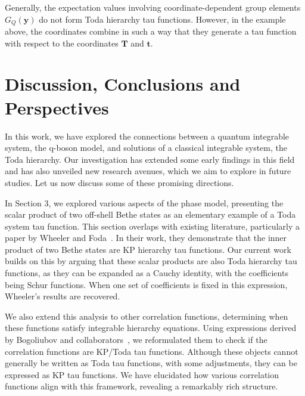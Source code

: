 \documentclass[a4paper,11pt]{amsart}
\begin{document}
Generally, the expectation values involving coordinate-dependent group
elements \(G_{Q}(\bm{y})\) do not form Toda hierarchy tau
functions. However, in the example above, the coordinates combine in
such a way that they generate a tau function with respect to the
coordinates \(\bm{T}\) and \(\bm{t}\).
 

\section{Discussion, Conclusions and Perspectives}


In this work, we have explored the connections between a quantum
integrable system, the q-boson model, and solutions of a classical
integrable system, the Toda hierarchy. Our investigation has extended
some early findings in this field and has also unveiled new research
avenues, which we aim to explore in future studies. Let us now discuss
some of these promising directions.

In Section 3, we explored various aspects of the phase model,
presenting the scalar product of two off-shell Bethe states as an
elementary example of a Toda system tau function. This section
overlaps with existing literature, particularly a paper by Wheeler and
Foda~\cite{Wheeler:2010vmq, Foda:2008hn}. In their work, they
demonstrate that the inner product of two Bethe states are KP
hierarchy tau functions. Our current work builds on this by arguing
that these scalar products are also Toda hierarchy tau functions, as
they can be expanded as a Cauchy identity, with the coefficients being
Schur functions. When one set of coefficients is fixed in this
expression, Wheeler's results are recovered.

We also extend this analysis to other correlation functions,
determining when these functions satisfy integrable hierarchy
equations. Using expressions derived by Bogoliubov and
collaborators~\cite{Bogoliubov:1997soj}, we reformulated them to check
if the correlation functions are KP/Toda tau functions. Although these
objects cannot generally be written as Toda tau functions, with some
adjustments, they can be expressed as KP tau functions.  We have
elucidated how various correlation functions align with this
framework, revealing a remarkably rich structure.
\end{document}
